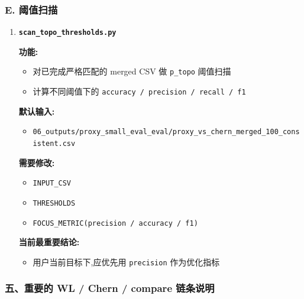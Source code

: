 \documentclass[lang=cn,scheme=chinese,color=blue,device=normal,toc=onecol,math=cm]{elegantbook}
\begin{document}
\subsubsection{E. 阈值扫描}


\begin{enumerate}
\item \textbf{\texttt{scan\_\allowbreak{}topo\_\allowbreak{}thresholds.py}}\par
 
\textbf{功能:}\par
 
\begin{itemize}
\item 对已完成严格匹配的 merged CSV 做 \texttt{p\_\allowbreak{}topo} 阈值扫描
\item 计算不同阈值下的 \texttt{accuracy /\allowbreak{} precision /\allowbreak{} recall /\allowbreak{} f1}
\end{itemize}
 
\textbf{默认输入:}\par
 
\begin{itemize}
\item \texttt{06\_\allowbreak{}outputs/\allowbreak{}proxy\_\allowbreak{}small\_\allowbreak{}eval\_\allowbreak{}eval/\allowbreak{}proxy\_\allowbreak{}vs\_\allowbreak{}chern\_\allowbreak{}merged\_\allowbreak{}100\_\allowbreak{}consistent.csv}
\end{itemize}
 
\textbf{需要修改:}\par
 
\begin{itemize}
\item \texttt{INPUT\_\allowbreak{}CSV}
\item \texttt{THRESHOLDS}
\item \texttt{FOCUS\_\allowbreak{}METRIC(precision /\allowbreak{} accuracy /\allowbreak{} f1)}
\end{itemize}
 
\textbf{当前最重要结论:}\par
 
\begin{itemize}
\item 用户当前目标下,应优先用 \texttt{precision} 作为优化指标
\end{itemize}
\end{enumerate}


\subsubsection{五、重要的 WL /\allowbreak{} Chern /\allowbreak{} compare 链条说明}
\end{document}
